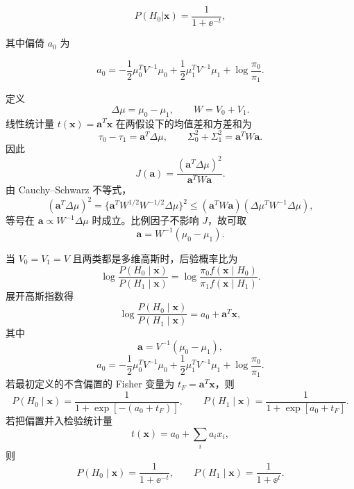 \begin{question}
\begin{enumerate}
\[
P(H_0|\mathbf{x})=\frac{1}{1+\ee^{-t}},
\]

其中偏倚 \(a_0\) 为

\[
a_0=-\frac12\mu_0^T V^{-1}\mu_0+\frac12\mu_1^T V^{-1}\mu_1+\log\frac{\pi_0}{\pi_1}.
\]
\end{enumerate}
\begin{solution}
定义
\[
\Delta\mu=\mu_0-\mu_1,
\qquad
W=V_0+V_1.
\]
线性统计量 \(t(\mathbf x)=\mathbf a^T\mathbf x\) 在两假设下的均值差和方差和为
\[
\tau_0-\tau_1=\mathbf a^T\Delta\mu,
\qquad
\Sigma_0^2+\Sigma_1^2=\mathbf a^TW\mathbf a.
\]
因此
\[
J(\mathbf a)=\frac{(\mathbf a^T\Delta\mu)^2}{\mathbf a^TW\mathbf a}.
\]
由 Cauchy--Schwarz 不等式，
\[
(\mathbf a^T\Delta\mu)^2
=\{\mathbf a^T W^{1/2}W^{-1/2}\Delta\mu\}^2
\le (\mathbf a^TW\mathbf a)(\Delta\mu^TW^{-1}\Delta\mu),
\]
等号在 \(\mathbf a\propto W^{-1}\Delta\mu\) 时成立。比例因子不影响
\(J\)，故可取
\[
\mathbf a=W^{-1}(\mu_0-\mu_1).
\]

当 \(V_0=V_1=V\) 且两类都是多维高斯时，后验概率比为
\[
\log\frac{P(H_0\mid\mathbf x)}{P(H_1\mid\mathbf x)}
=\log\frac{\pi_0f(\mathbf x\mid H_0)}{\pi_1f(\mathbf x\mid H_1)}.
\]
展开高斯指数得
\[
\log\frac{P(H_0\mid\mathbf x)}{P(H_1\mid\mathbf x)}
=a_0+\mathbf a^T\mathbf x,
\]
其中
\[
\mathbf a=V^{-1}(\mu_0-\mu_1),
\]
\[
a_0=-\frac12\mu_0^TV^{-1}\mu_0
+\frac12\mu_1^TV^{-1}\mu_1+
\log\frac{\pi_0}{\pi_1}.
\]
若最初定义的不含偏置的 Fisher 变量为 \(t_F=\mathbf a^T\mathbf x\)，则
\[
P(H_0\mid\mathbf x)=
\frac{1}{1+\exp[-(a_0+t_F)]},
\qquad
P(H_1\mid\mathbf x)=
\frac{1}{1+\exp[a_0+t_F]}.
\]
若把偏置并入检验统计量
\[
t(\mathbf x)=a_0+\sum_i a_ix_i,
\]
则
\[
P(H_0\mid\mathbf x)=\frac{1}{1+\ee^{-t}},
\qquad
P(H_1\mid\mathbf x)=\frac{1}{1+\ee^{t}}.
\]
\end{solution}
\end{question}


